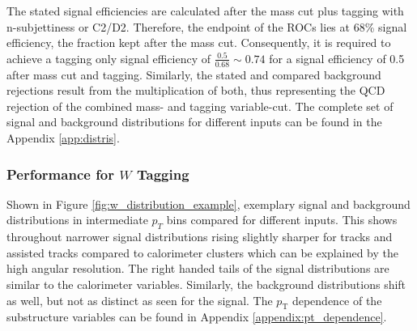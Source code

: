 
The stated signal efficiencies are calculated after the mass cut plus tagging with n-subjettiness or C2/D2. Therefore, the endpoint of the ROCs lies at 68\% signal efficiency, the fraction kept after the mass cut. Consequently, it is required to achieve a tagging only signal efficiency of $\frac{0.5}{0.68} \sim 0.74$ for a signal efficiency of 0.5 after mass cut and tagging. Similarly, the stated and compared background rejections result from the multiplication of both, thus representing the QCD rejection of the combined mass- and tagging variable-cut. The complete set of signal and background distributions for different inputs can be found in the Appendix \ref{app:distris}.

\subsubsection{Performance for $W$ Tagging}
Shown in Figure \ref{fig:w_distribution_example}, exemplary signal and background distributions in intermediate $p_T$ bins compared for different inputs. This shows throughout narrower signal distributions rising slightly sharper for tracks and assisted tracks compared to calorimeter clusters which can be explained by the high angular resolution. The right handed tails of the signal distributions are similar to the calorimeter variables. Similarly, the background distributions shift as well, but not as distinct as seen for the signal. The $p_{\mathrm{T}}$ dependence of the substructure variables can be found in Appendix \ref{appendix:pt_dependence}.
